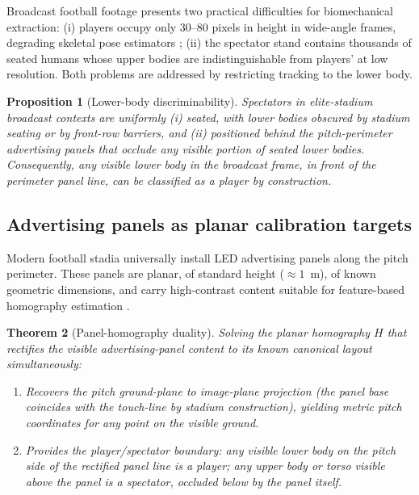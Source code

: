 \documentclass[11pt,twocolumn,a4paper]{article}
\newtheorem{theorem}{Theorem}[section]
\newtheorem{proposition}[theorem]{Proposition}
\theoremstyle{definition}
\theoremstyle{remark}
\begin{document}
Broadcast football footage presents two practical difficulties for
biomechanical extraction: (i) players occupy only 30--80 pixels in
height in wide-angle frames, degrading skeletal pose estimators
\citep{cao2017,bazarevsky2020,newell2016}; (ii) the spectator stand
contains thousands of seated humans whose upper bodies are
indistinguishable from players' at low resolution. Both problems are
addressed by restricting tracking to the lower body.

\begin{proposition}[Lower-body discriminability]
\label{prop:lower}
Spectators in elite-stadium broadcast contexts are uniformly
(i) seated, with lower bodies obscured by stadium seating or by
front-row barriers, and (ii) positioned behind the pitch-perimeter
advertising panels that occlude any visible portion of seated
lower bodies. Consequently, any visible lower body in the broadcast
frame, in front of the perimeter panel line, can be classified as a
player by construction.
\end{proposition}

\subsection{Advertising panels as planar calibration targets}

Modern football stadia universally install LED advertising panels along
the pitch perimeter. These panels are planar, of standard height
($\approx 1$~m), of known geometric dimensions, and carry
high-contrast content suitable for feature-based homography estimation
\citep{hartley2003,zhang2000}.

\begin{theorem}[Panel-homography duality]
\label{thm:panelhom}
Solving the planar homography $H$ that rectifies the visible
advertising-panel content to its known canonical layout
simultaneously:
\begin{enumerate}[leftmargin=1.4em]
  \item Recovers the pitch ground-plane to image-plane projection (the
    panel base coincides with the touch-line by stadium construction),
    yielding metric pitch coordinates for any point on the visible
    ground.
  \item Provides the player/spectator boundary: any visible lower body
    on the pitch side of the rectified panel line is a player; any
    upper body or torso visible above the panel is a spectator,
    occluded below by the panel itself.
\end{enumerate}
\end{theorem}
\end{document}
